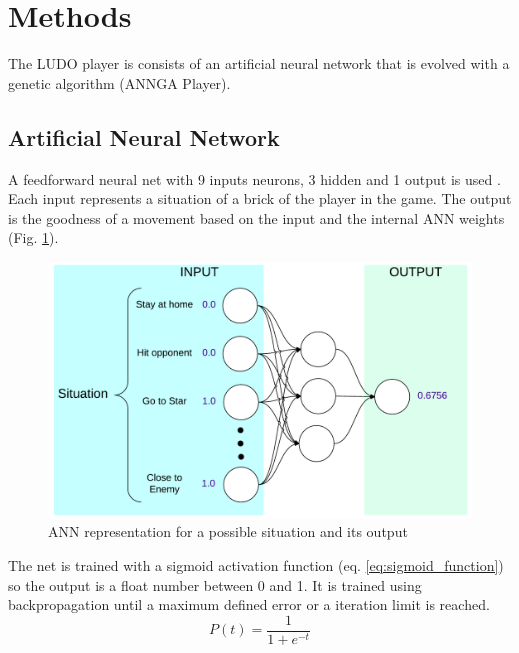 \section{Methods} %
\label{sec:methods}
The LUDO player is consists of an artificial neural network that is evolved with a genetic algorithm (ANNGA Player).
	\subsection{Artificial Neural Network} %
	\label{sub:artificial_neural_network}
	A feedforward neural net with 9 inputs neurons, 3 hidden and 1 output is used \cite{kasper}. 
	Each input represents a situation of a brick of the player in the game. 
	The output is the goodness of a movement based on the input and the internal ANN weights (Fig. \ref{fig:ann_scheme}).
	\begin{figure}[ht]
		\centering
		\includegraphics[width=\textwidth]{figures/ann_scheme}
		\caption{ANN representation for a possible situation and its output}
		\label{fig:ann_scheme}
	\end{figure}
	The net is trained with a sigmoid activation function (eq. \ref{eq:sigmoid_function}) so the output is a float number between 0 and 1.
	It is trained using backpropagation until a maximum defined error or a iteration limit is reached.
	\begin{equation}
		P(t)=\frac{1}{1+e^{-t}}
		\label{eq:sigmoid_function}
	\end{equation}

